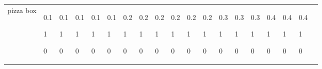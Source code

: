 \begin{tabular}{||p{1.35cm}|p{0.50cm}p{0.50cm}p{0.50cm}p{0.50cm}p{0.50cm}p{0.50cm}p{0.50cm}p{0.50cm}p{0.50cm}p{0.50cm}p{0.50cm}p{0.50cm}p{0.50cm}p{0.50cm}p{0.50cm}p{0.50cm}p{0.50cm}c||}
\hline \hline pizza box & {\small 0.1}\par{\scriptsize\parbox{1.0cm}{1}} \par{\scriptsize 0} & {\small 0.1}\par{\scriptsize\parbox{1.0cm}{1}} \par{\scriptsize 0} & {\small 0.1}\par{\scriptsize\parbox{1.0cm}{1}} \par{\scriptsize 0} & {\small 0.1}\par{\scriptsize\parbox{1.0cm}{1}} \par{\scriptsize 0} & {\small 0.1}\par{\scriptsize\parbox{1.0cm}{1}} \par{\scriptsize 0} & {\small 0.2}\par{\scriptsize\parbox{1.0cm}{1}} \par{\scriptsize 0} & {\small 0.2}\par{\scriptsize\parbox{1.0cm}{1}} \par{\scriptsize 0} & {\small 0.2}\par{\scriptsize\parbox{1.0cm}{1}} \par{\scriptsize 0} & {\small 0.2}\par{\scriptsize\parbox{1.0cm}{1}} \par{\scriptsize 0} & {\small 0.2}\par{\scriptsize\parbox{1.0cm}{1}} \par{\scriptsize 0} & {\small 0.2}\par{\scriptsize\parbox{1.0cm}{1}} \par{\scriptsize 0} & {\small 0.3}\par{\scriptsize\parbox{1.0cm}{1}} \par{\scriptsize 0} & {\small 0.3}\par{\scriptsize\parbox{1.0cm}{1}} \par{\scriptsize 0} & {\small 0.3}\par{\scriptsize\parbox{1.0cm}{1}} \par{\scriptsize 0} & {\small 0.4}\par{\scriptsize\parbox{1.0cm}{1}} \par{\scriptsize 0} & {\small 0.4}\par{\scriptsize\parbox{1.0cm}{1}} \par{\scriptsize 0} & {\small 0.4}\par{\scriptsize\parbox{1.0cm}{1}} \par{\scriptsize 0} & \\

\end{tabular}
